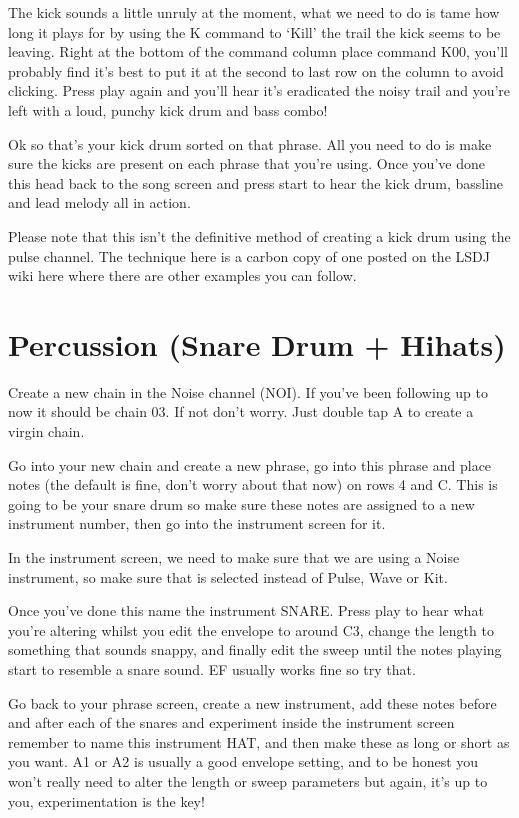 \documentclass[]{article}
\begin{document}
The kick sounds a little unruly at the moment, what we need to do is tame how long it plays for by using the K command to ‘Kill’ the trail the kick seems to be leaving. Right at the bottom of the command column place command K00, you’ll probably find it’s best to put it at the second to last row on the column to avoid clicking. Press play again and you’ll hear it’s eradicated the noisy trail and you’re left with a loud, punchy kick drum and bass combo!

Ok so that’s your kick drum sorted on that phrase. All you need to do is make sure the kicks are present on each phrase that you’re using. Once you’ve done this head back to the song screen and press start to hear the kick drum, bassline and lead melody all in action.

Please note that this isn’t the definitive method of creating a kick drum using the pulse channel. The technique here is a carbon copy of one posted on the LSDJ wiki here where there are other examples you can follow.

\section{Percussion (Snare Drum + Hihats)}
Create a new chain in the Noise channel (NOI). If you’ve been following up to now it should be chain 03. If not don’t worry. Just double tap A to create a virgin chain.

Go into your new chain and create a new phrase, go into this phrase and place notes (the default is fine, don’t worry about that now) on rows 4 and C. This is going to be your snare drum so make sure these notes are assigned to a new instrument number, then go into the instrument screen for it.

In the instrument screen, we need to make sure that we are using a Noise instrument, so make sure that is selected instead of Pulse, Wave or Kit.

Once you’ve done this name the instrument SNARE. Press play to hear what you’re altering whilst you edit the envelope to around C3, change the length to something that sounds snappy, and finally edit the sweep until the notes playing start to resemble a snare sound. EF usually works fine so try that.

Go back to your phrase screen, create a new instrument, add these notes before and after each of the snares and experiment inside the instrument screen remember to name this instrument HAT, and then make these as long or short as you want. A1 or A2 is usually a good envelope setting, and to be honest you won’t really need to alter the length or sweep parameters but again, it’s up to you, experimentation is the key!
\end{document}
